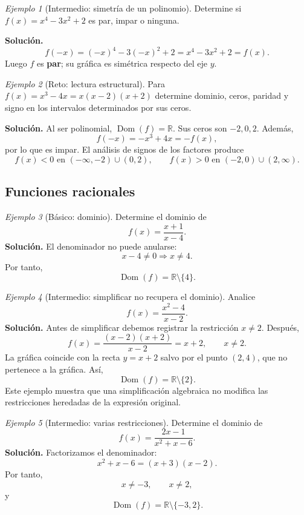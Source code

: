 \documentclass[12pt]{article}
\theoremstyle{remark}
\newtheorem{ejemplo}{Ejemplo}[section]
\newcommand{\R}{\mathbb{R}}
\newcommand{\Dom}{\operatorname{Dom}}
\begin{document}
\begin{ejemplo}[Intermedio: simetría de un polinomio]
Determine si $f(x)=x^4-3x^2+2$ es par, impar o ninguna.

\textbf{Solución.}
\[
f(-x)=(-x)^4-3(-x)^2+2=x^4-3x^2+2=f(x).
\]
Luego $f$ es \textbf{par}; su gráfica es simétrica respecto del eje $y$.
\end{ejemplo}

\begin{ejemplo}[Reto: lectura estructural]
Para $f(x)=x^3-4x=x(x-2)(x+2)$ determine dominio, ceros, paridad y signo en los intervalos determinados por sus ceros.

\textbf{Solución.} Al ser polinomial, $\Dom(f)=\R$. Sus ceros son $-2,0,2$. Además,
\[
f(-x)=-x^3+4x=-f(x),
\]
por lo que es impar. El análisis de signos de los factores produce
\[
f(x)<0\text{ en }(-\infty,-2)\cup(0,2),
\qquad
f(x)>0\text{ en }(-2,0)\cup(2,\infty).
\]
\end{ejemplo}

\subsection{Funciones racionales}

\begin{ejemplo}[Básico: dominio]
Determine el dominio de
\[
f(x)=\frac{x+1}{x-4}.
\]
\textbf{Solución.} El denominador no puede anularse:
\[
x-4\neq0\Longrightarrow x\neq4.
\]
Por tanto,
\[
\boxed{\Dom(f)=\R\setminus\{4\}}.
\]
\end{ejemplo}

\begin{ejemplo}[Intermedio: simplificar no recupera el dominio]
Analice
\[
f(x)=\frac{x^2-4}{x-2}.
\]
\textbf{Solución.} Antes de simplificar debemos registrar la restricción $x\neq2$. Después,
\[
f(x)=\frac{(x-2)(x+2)}{x-2}=x+2,\qquad x\neq2.
\]
La gráfica coincide con la recta $y=x+2$ salvo por el punto $(2,4)$, que no pertenece a la gráfica. Así,
\[
\boxed{\Dom(f)=\R\setminus\{2\}}.
\]
Este ejemplo muestra que una simplificación algebraica no modifica las restricciones heredadas de la expresión original.
\end{ejemplo}

\begin{ejemplo}[Intermedio: varias restricciones]
Determine el dominio de
\[
f(x)=\frac{2x-1}{x^2+x-6}.
\]
\textbf{Solución.} Factorizamos el denominador:
\[
x^2+x-6=(x+3)(x-2).
\]
Por tanto,
\[
x\neq-3,\qquad x\neq2,
\]
y
\[
\boxed{\Dom(f)=\R\setminus\{-3,2\}}.
\]
\end{ejemplo}
\end{document}
